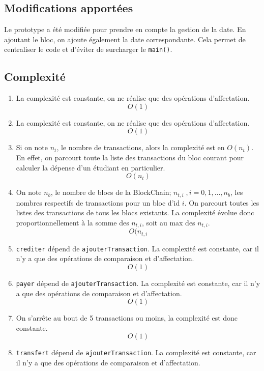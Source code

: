 \documentclass[
	12pt, %
]{fphw}
\begin{document}
\subsection*{Modifications apportées}
\begin{problem}
\end{problem}
Le prototype a été modifiée pour prendre en compte la gestion de la date. En ajoutant le bloc, on ajoute également la date correspondante. Cela permet de centraliser le code et d'éviter de surcharger le \texttt{main()}.

\subsection*{Complexité}
\begin{enumerate}
	\item La complexité est constante, on ne réalise que des opérations d'affectation. 
	\[O(1)\] 
	\item La complexité est constante, on ne réalise que des opérations d'affectation. 
	\[O(1)\] 
	\item Si on note $n_t$, le nombre de transactions, alors la complexité est en $O(n_t)$. En effet, on parcourt toute la liste des transactions du bloc courant pour calculer la dépense d'un étudiant en particulier. \[O(n_t)\]
	\item On note $n_b$, le nombre de blocs de la BlockChain; $n_{t,i}\;, i=0,1,...,n_b$, les nombres respectifs de transactions pour un bloc d'id $i$. On parcourt toutes les listes des transactions de tous les blocs existants. La complexité évolue donc proportionnellement à la somme des $n_{t,i}$, soit au max des $n_{t,i}$.
	\[O(n_{t,i}\]
	\item \texttt{crediter} dépend de \texttt{ajouterTransaction}. La complexité est constante, car il n'y a que des opérations de comparaison et d'affectation.
	\[O(1)\]
	\item \texttt{payer} dépend de \texttt{ajouterTransaction}. La complexité est constante, car il n'y a que des opérations de comparaison et d'affectation.
	\[O(1)\]
	\item On s'arrête au bout de 5 transactions ou moins, la complexité est donc constante. 
	\[O(1)\]
	\item \texttt{transfert} dépend de \texttt{ajouterTransaction}. La complexité est constante, car il n'y a que des opérations de comparaison et d'affectation.
\end{enumerate}

\end{document}
